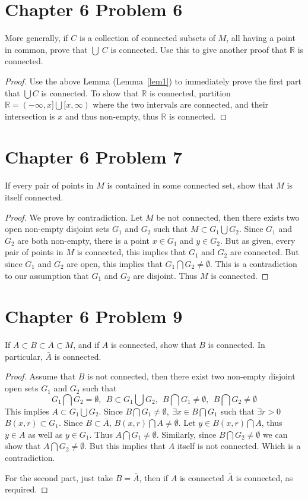 \documentclass{article}
\newtheorem{proof}{Proof}
\def\RR{\mathbb R}
\begin{document}
\section{Chapter 6 Problem 6}
More generally, if $C$ is a collection of connected subsets of $M$, 
all having a point in common, prove that $\bigcup\ C$ is connected. Use this
to give another proof that $\RR$ is connected.
\begin{proof}
Use the above Lemma (Lemma~\ref{lem1}) to immediately prove
the first part that $\bigcup C$ is connected.
 To show that $\RR$ is connected, partition
$\RR=(-\infty,x]\bigcup[x,\infty)$ where the two intervals are connected, and
their intersection is $x$ and thus non-empty, thus $\RR$ is connected.
\end{proof}
\section{Chapter 6 Problem 7}
If every pair of points in $M$ is contained in some connected set, show
that $M$ is itself connected.
\begin{proof}
We prove by contradiction. Let $M$ be not connected, then there exists
two open non-empty disjoint sets $G_1$ and $G_2$ such that $M\subset G_1 \bigcup G_2$.
Since $G_1$ and $G_2$ are both non-empty, there is a point $x\in G_1$ and
$y\in G_2$. But as given, every pair of points in $M$ is connected, this
implies that $G_1$ and $G_2$ are connected. But since $G_1$ and $G_2$ are
open, this implies that $G_1\bigcap G_2\ne\emptyset$. This is a
contradiction to our assumption that $G_1$ and $G_2$ are disjoint. Thus $M$
is connected.
\end{proof}

\section{Chapter 6 Problem 9}
If $A\subset B \subset \bar{A} \subset M$, and if $A$ is
connected, show that $B$ is connected. In particular, $\bar{A}$
is connected.
\begin{proof}
Assume that $B$ is not connected, then there exist two non-empty disjoint
open sets $G_1$ and $G_2$ such that
\[
G_1\bigcap G_2=\emptyset, \ \ B\subset G_1\bigcup G_2,\ \ B\bigcap G_1\ne\emptyset,\ \ B\bigcap G_2\ne\emptyset
\]
This implies $A\subset G_1\bigcup G_2$.
Since $B\bigcap G_1\ne\emptyset, \ \exists x\in B\bigcap G_1$ such that $\exists r>0$
$B(x,r)\subset G_1$. Since $B\subset\bar{A}$, $B(x,r)\bigcap A\ne\emptyset$.
Let $y\in B(x,r)\bigcap A$, thus $y\in A$ as well as $y\in G_1$.
Thus $A\bigcap G_1\ne\emptyset$. Similarly, since $B\bigcap G_2\ne\emptyset$ we can show
that $A\bigcap G_2\ne\emptyset$. But this implies that $A$ itself is not connected.
Which is a contradiction.

For the second part, just take $B=\bar{A}$, then if $A$
is connected $\bar{A}$ is connected, as required.
\end{proof}
\end{document}
